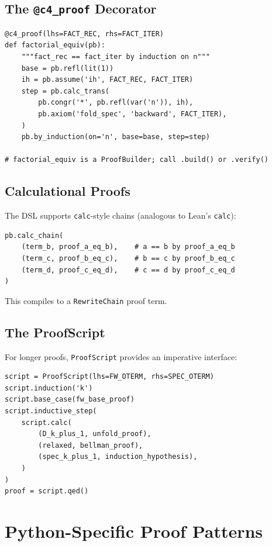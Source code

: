 \subsection{The \texttt{@c4\_proof} Decorator}

\begin{lstlisting}
@c4_proof(lhs=FACT_REC, rhs=FACT_ITER)
def factorial_equiv(pb):
    """fact_rec == fact_iter by induction on n"""
    base = pb.refl(lit(1))
    ih = pb.assume('ih', FACT_REC, FACT_ITER)
    step = pb.calc_trans(
        pb.congr('*', pb.refl(var('n')), ih),
        pb.axiom('fold_spec', 'backward', FACT_ITER),
    )
    pb.by_induction(on='n', base=base, step=step)

# factorial_equiv is a ProofBuilder; call .build() or .verify()
\end{lstlisting}

\subsection{Calculational Proofs}

The DSL supports \texttt{calc}-style chains (analogous to Lean's \texttt{calc}):

\begin{lstlisting}
pb.calc_chain(
    (term_b, proof_a_eq_b),    # a == b by proof_a_eq_b
    (term_c, proof_b_eq_c),    # b == c by proof_b_eq_c
    (term_d, proof_c_eq_d),    # c == d by proof_c_eq_d
)
\end{lstlisting}

This compiles to a \texttt{RewriteChain} proof term.

\subsection{The ProofScript}

For longer proofs, \texttt{ProofScript} provides an imperative interface:

\begin{lstlisting}
script = ProofScript(lhs=FW_OTERM, rhs=SPEC_OTERM)
script.induction('k')
script.base_case(fw_base_proof)
script.inductive_step(
    script.calc(
        (D_k_plus_1, unfold_proof),
        (relaxed, bellman_proof),
        (spec_k_plus_1, induction_hypothesis),
    )
)
proof = script.qed()
\end{lstlisting}


\section{Python-Specific Proof Patterns}

